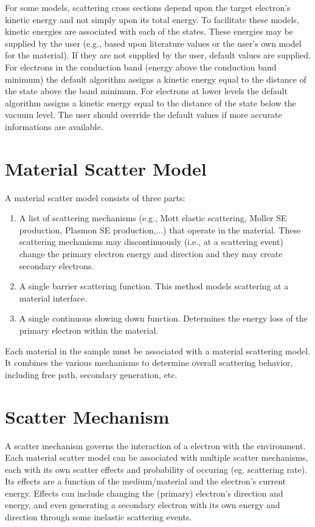 For some models, scattering cross sections depend upon the target electron's kinetic energy and not simply upon its total energy. To facilitate these models, kinetic energies are associated with each of the states. These energies may be supplied by the user (e.g., based upon literature values or the user's own model for the material). If they are not supplied by the user, default values are supplied. For electrons in the conduction band (energy above the conduction band minimum) the default algorithm assigns a kinetic energy equal to the distance of the state above the band minimum. For electrons at lower levels the default algorithm assigns a kinetic energy equal to the distance of the state below the vacuum level. The user should override the default values if more accurate informations are available. 

\section{Material Scatter Model}\label{con:msm}
A material scatter model consists of three parts:
\begin{enumerate}
\item A list of scattering mechanisms (e.g., Mott elastic scattering, Moller SE production, Plasmon SE production,...) that operate in the material. These scattering mechanisms may discontinuously (i.e., at a scattering event) change the primary electron energy and direction and they may create secondary electrons. 
\item A single barrier scattering function. This method models scattering at a material interface. 
\item A single continuous slowing down function. Determines the energy loss of the primary electron within the material. 
\end{enumerate}
Each material in the sample must be associated with a material scattering model. It combines the various mechanisms to determine overall scattering behavior, including free path, secondary generation, etc. 

\section{Scatter Mechanism}\label{con:sm}
A scatter mechanism governs the interaction of a electron with the environment. Each material scatter model can be associated with multiple scatter mechanisms, each with its own scatter effects and probability of occuring (eg. scattering rate). Its effects are a function of the medium/material and the electron's current energy. Effects can include changing the (primary) electron's direction and energy, and even generating a secondary electron with its own energy and direction through some inelastic scattering events. 

